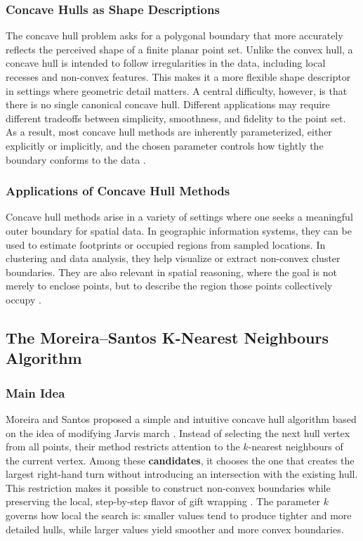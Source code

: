 \documentclass[10pt,twocolumn]{article}
\begin{document}
\subsubsection{Concave Hulls as Shape Descriptions}
The concave hull problem asks for a polygonal boundary that more accurately reflects the perceived shape of a finite planar point set. Unlike the convex hull, a concave hull is intended to follow irregularities in the data, including local recesses and non-convex features. This makes it a more flexible shape descriptor in settings where geometric detail matters.
A central difficulty, however, is that there is no single canonical concave hull. Different applications may require different tradeoffs between simplicity, smoothness, and fidelity to the point set. As a result, most concave hull methods are inherently parameterized, either explicitly or implicitly, and the chosen parameter controls how tightly the boundary conforms to the data \citep{galton2006, duckham2008}.
\subsubsection{Applications of Concave Hull Methods}
Concave hull methods arise in a variety of settings where one seeks a meaningful outer boundary for spatial data. In geographic information systems, they can be used to estimate footprints or occupied regions from sampled locations. In clustering and data analysis, they help visualize or extract non-convex cluster boundaries. They are also relevant in spatial reasoning, where the goal is not merely to enclose points, but to describe the region those points collectively occupy \citep{galton2006}.
\subsection{The Moreira--Santos K-Nearest Neighbours Algorithm}
\subsubsection{Main Idea}
Moreira and Santos \citep{moreira2007} proposed a simple and intuitive concave hull algorithm based on the idea of modifying Jarvis march \citep{jarvis1973}. Instead of selecting the next hull vertex from all points, their method restricts attention to the $k$-nearest neighbours of the current vertex. Among these \textbf{candidates}, it chooses the one that creates the largest right-hand turn without introducing an intersection with the existing hull.
This restriction makes it possible to construct non-convex boundaries while preserving the local, step-by-step flavor of gift wrapping \citep{jarvis1973}. The parameter $k$ governs how local the search is: smaller values tend to produce tighter and more detailed hulls, while larger values yield smoother and more convex boundaries.
\end{document}
